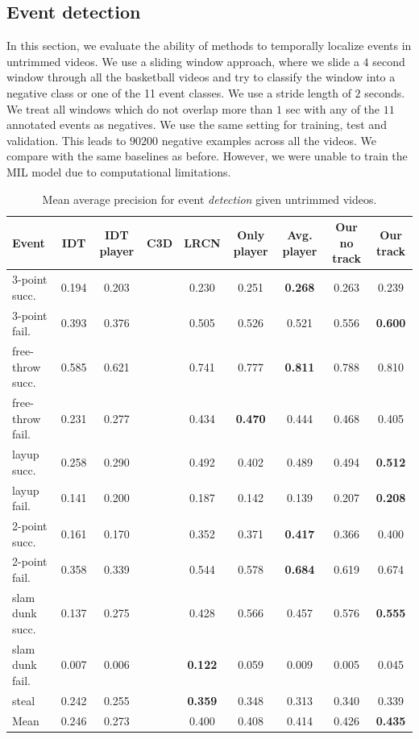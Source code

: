 \subsection{Event detection}

In this section, we evaluate the ability of methods to temporally localize
events in untrimmed videos.  We use a sliding window approach, where we slide a
$4$ second window through all the basketball videos and try to classify the
window into a negative class or one of the 11 event classes. We use a stride
length of $2$ seconds.  We treat all windows which do not overlap more than $1$
sec with any of the $11$ annotated events as negatives. We use the same setting
for training, test and validation.  This leads to $90200$ negative examples
across all the videos.  We compare with the same baselines as before. However,
we were unable to train the MIL model due to computational limitations.

\begin{table}[ht!]
\begin{center}
\small
 \begin{tabular}{|l|c|c|c|c|c|c|c|c|}
  \hline
Event & IDT\cite{Wang_CVPR11} & IDT player\cite{Wang_CVPR11} & C3D \cite{Tran_arxiv14} & LRCN \cite{Donahue_arxiv14} & Only player & Avg. player & Our no track & Our track \\ \hline \hline
3-point succ.    & 0.194  & 0.203 &  & 0.230 & 0.251 & \textbf{0.268} & 0.263 & 0.239 \\
3-point fail.    & 0.393  & 0.376 &  & 0.505 & 0.526 & 0.521 & 0.556 & \textbf{0.600} \\
free-throw succ. & 0.585  & 0.621 &  & 0.741 & 0.777 & \textbf{0.811} & 0.788 & 0.810 \\
free-throw fail. & 0.231  & 0.277 &  & 0.434 & \textbf{0.470} & 0.444 & 0.468 & 0.405 \\
layup succ.      & 0.258  & 0.290 &  & 0.492 & 0.402 & 0.489 & 0.494 & \textbf{0.512} \\
layup fail.      & 0.141  & 0.200 &  & 0.187 & 0.142 & 0.139 & 0.207 & \textbf{0.208} \\
2-point succ.    & 0.161  & 0.170 &  & 0.352 & 0.371 & \textbf{0.417} & 0.366 & 0.400 \\
2-point fail.    & 0.358  & 0.339 &  & 0.544 & 0.578 & \textbf{0.684} & 0.619 & 0.674 \\
  slam dunk succ.& 0.137  & 0.275 &  & 0.428 & 0.566 & 0.457 & 0.576 & \textbf{0.555} \\
slam dunk fail.  & 0.007  & 0.006 &  & \textbf{0.122} & 0.059 & 0.009 & 0.005 & 0.045 \\
steal            & 0.242  & 0.255 &  & \textbf{0.359} & 0.348 & 0.313 & 0.340 & 0.339 \\ \hline \hline
Mean             & 0.246  & 0.273 &  & 0.400 & 0.408 & 0.414 & 0.426 & \textbf{0.435} \\ \hline
  \end{tabular}
\end{center}
  \caption{Mean average precision for event {\em detection} given
    untrimmed videos.}
  \label{tab:detection_res}
\end{table}

